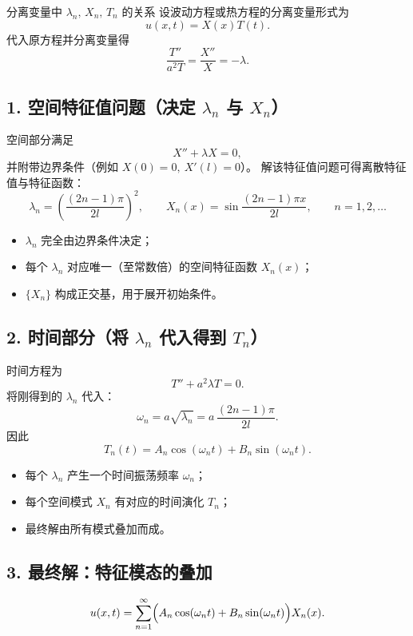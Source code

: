 \begin{note}{分离变量中 $\lambda_n,\,X_n,\,T_n$ 的关系}{}
设波动方程或热方程的分离变量形式为
\[
u(x,t)=X(x)T(t).
\]
代入原方程并分离变量得
\[
\frac{T''}{a^{2}T}=\frac{X''}{X}=-\lambda.
\]
\end{note}

\subsection*{1. 空间特征值问题（决定 $\lambda_n$ 与 $X_n$）}

空间部分满足
\[
X''+\lambda X=0,
\]
并附带边界条件（例如 $X(0)=0,\ X'(l)=0$）。
解该特征值问题可得离散特征值与特征函数：
\[
\lambda_n=\left(\frac{(2n-1)\pi}{2l}\right)^{2},\qquad
X_n(x)=\sin\frac{(2n-1)\pi x}{2l},\qquad n=1,2,\dots
\]

\begin{itemize}
    \item $\lambda_n$ 完全由边界条件决定；
    \item 每个 $\lambda_n$ 对应唯一（至常数倍）的空间特征函数 $X_n(x)$；
    \item $\{X_n\}$ 构成正交基，用于展开初始条件。
\end{itemize}

\subsection*{2. 时间部分（将 $\lambda_n$ 代入得到 $T_n$）}

时间方程为
\[
T''+a^{2}\lambda T=0.
\]
将刚得到的 $\lambda_n$ 代入：
\[
\omega_n=a\sqrt{\lambda_n}
       =a\,\frac{(2n-1)\pi}{2l}.
\]
因此
\[
T_n(t)=A_n\cos(\omega_n t)+B_n\sin(\omega_n t).
\]

\begin{itemize}
    \item 每个 $\lambda_n$ 产生一个时间振荡频率 $\omega_n$；
    \item 每个空间模式 $X_n$ 有对应的时间演化 $T_n$；
    \item 最终解由所有模式叠加而成。
\end{itemize}

\subsection*{3. 最终解：特征模态的叠加}

\[
u(x,t)=\sum_{n=1}^{\infty}
\Bigl(A_n\cos(\omega_n t)+B_n\sin(\omega_n t)\Bigr)
X_n(x).
\]

